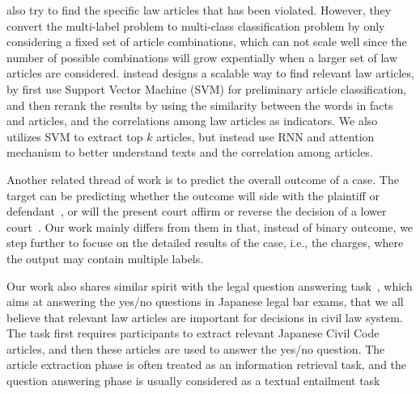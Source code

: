 \cite{liu2005classifying,liu2006exploring} also try to find the specific law articles that has been violated. However, they convert the multi-label problem to multi-class classification problem by only considering a fixed set of article combinations, which can not scale well since the number of possible combinations will grow expentially when a larger set of law articles are considered.
\cite{liu2015predicting} instead designs a scalable way to find relevant law articles, 
by first use Support Vector Machine (SVM) for preliminary article classification, and then 
rerank the results by using the similarity between the words in facts and articles, and the correlations among law articles as indicators.
We also utilizes SVM to extract top $k$ articles, but instead use RNN and attention mechanism to better understand texts and the correlation among articles.

Another related thread of work is to predict the overall outcome of a case. The target can be predicting whether the outcome will side with the plaintiff or defendant~\cite{aletras2016predicting}, or will the present court affirm or reverse the decision of a lower court~\cite{katz2016general}. Our work mainly differs from them in that, instead of binary outcome, we step further to focuse on the detailed results of the case, i.e., the charges, where the output may contain multiple labels. 



Our work also shares similar spirit with the legal question answering task~\cite{COLIEE14}, which aims at answering the yes/no questions in Japanese legal bar exams, that we all believe that relevant law articles are important for decisions in civil law system. 
The task first requires participants to extract relevant Japanese Civil Code articles, and then these articles are used to answer the yes/no question. 
The article extraction phase is often treated as an information retrieval task, and the question answering phase is usually considered as a textual entailment task~\cite{kim2014legal,kimconvolutional}
